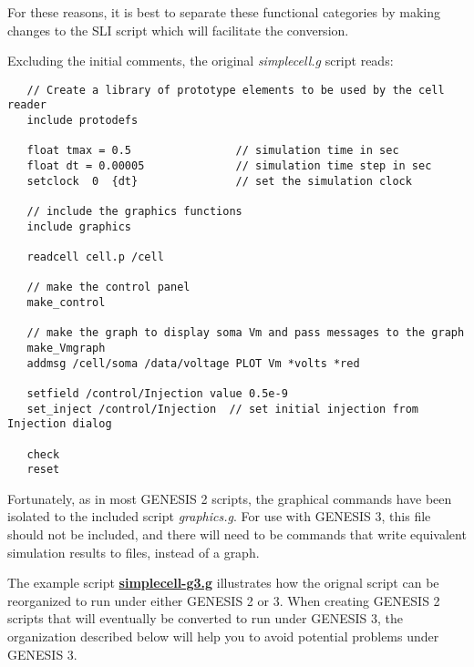 \documentclass[12pt]{article}
\begin{document}
For these reasons, it is best to separate these functional categories
by making changes to the SLI script which will facilitate the conversion.

Excluding the initial comments, the original {\it simplecell.g} script reads:
\begin{verbatim}
   // Create a library of prototype elements to be used by the cell reader
   include protodefs

   float tmax = 0.5                // simulation time in sec
   float dt = 0.00005              // simulation time step in sec
   setclock  0  {dt}               // set the simulation clock

   // include the graphics functions
   include graphics

   readcell cell.p /cell

   // make the control panel
   make_control

   // make the graph to display soma Vm and pass messages to the graph
   make_Vmgraph
   addmsg /cell/soma /data/voltage PLOT Vm *volts *red

   setfield /control/Injection value 0.5e-9
   set_inject /control/Injection  // set initial injection from Injection dialog

   check
   reset
\end{verbatim}

Fortunately, as in most GENESIS 2 scripts, the graphical commands have
been isolated to the included script {\it graphics.g}.   For use with GENESIS 3,
this file should not be included, and there will need to be commands
that write equivalent simulation results to files, instead of a graph.

The example script \href{figures/simplecell-g3.txt}{\bf simplecell-g3.g} illustrates how the orignal
script can be reorganized to run under either GENESIS 2 or 3.  When creating GENESIS 2 scripts that
will eventually be converted to run under GENESIS 3, the organization described below will help you
to avoid potential problems under GENESIS 3.
\end{document}
